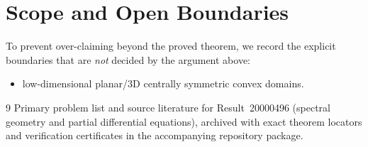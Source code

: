 \documentclass[10pt,reqno]{amsart}
\theoremstyle{definition}
\begin{document}
\section{Scope and Open Boundaries}

To prevent over-claiming beyond the proved theorem, we record the explicit boundaries that are \emph{not} decided by the argument above:
\begin{itemize}
  \item low-dimensional planar/3D centrally symmetric convex domains.
\end{itemize}

\begin{thebibliography}{9}
Primary problem list and source literature for Result~20000496 (spectral geometry and partial differential equations), archived with exact theorem locators and verification certificates in the accompanying repository package.
\end{thebibliography}
\end{document}
